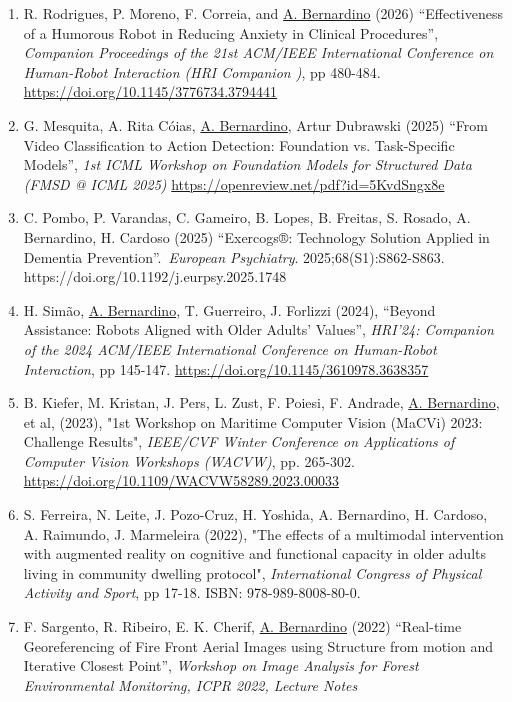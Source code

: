 \begin{enumerate}
\def\labelenumi{\arabic{enumi}.}
\item
  R. Rodrigues, P. Moreno, F. Correia, and \ul{A. Bernardino} (2026)
  ``Effectiveness of a Humorous Robot in Reducing Anxiety in Clinical
  Procedures'', \emph{Companion Proceedings of the 21st ACM/IEEE
  International Conference on Human-Robot Interaction (HRI Companion
  )}, pp 480-484.
  \url{https://doi.org/10.1145/3776734.3794441}
\item
  G. Mesquita, A. Rita Cóias, \ul{A. Bernardino}, Artur Dubrawski (2025)
  ``From Video Classification to Action Detection: Foundation vs.
  Task-Specific Models'', \emph{1st ICML Workshop on Foundation Models
  for Structured Data (FMSD @ ICML 2025)}
  \url{https://openreview.net/pdf?id=5KvdSngx8e}
\item
  C. Pombo, P. Varandas, C. Gameiro, B. Lopes, B. Freitas, S. Rosado, A.
  Bernardino, H. Cardoso (2025) ``Exercogs®: Technology Solution Applied
  in Dementia Prevention''.~\emph{European Psychiatry}.
  2025;68(S1):S862-S863. https://doi.org/10.1192/j.eurpsy.2025.1748
\item
  H. Simão, \ul{A. Bernardino}, T. Guerreiro, J. Forlizzi (2024),
  ``Beyond Assistance: Robots Aligned with Older Adults' Values'',
  \emph{HRI'24: Companion of the 2024 ACM/IEEE International Conference
  on Human-Robot Interaction}, pp 145-147.
  \url{https://doi.org/10.1145/3610978.3638357}
\item
  B. Kiefer, M. Kristan, J. Pers, L. Zust, F. Poiesi, F. Andrade, \ul{A.
  Bernardino}, et al, (2023), "1st Workshop on Maritime Computer Vision
  (MaCVi) 2023: Challenge Results", \emph{IEEE/CVF Winter Conference on
  Applications of Computer Vision Workshops (WACVW)}, pp. 265-302.
  \url{https://doi.org/10.1109/WACVW58289.2023.00033}
\item
  S. Ferreira, N. Leite, J. Pozo-Cruz, H. Yoshida, A. Bernardino, H.
  Cardoso, A. Raimundo, J. Marmeleira (2022), "The effects of a
  multimodal intervention with augmented reality on cognitive and
  functional capacity in older adults living in community dwelling
  protocol", \emph{International Congress of Physical Activity and
  Sport}, pp 17-18. ISBN: 978-989-8008-80-0.
\item
  F. Sargento, R. Ribeiro, E. K. Cherif, \ul{A. Bernardino} (2022)
  ``Real-time Georeferencing of Fire Front Aerial Images using Structure
  from motion and Iterative Closest Point'', \emph{Workshop on Image
  Analysis for Forest Environmental Monitoring, ICPR 2022, Lecture Notes
}
\end{enumerate}
